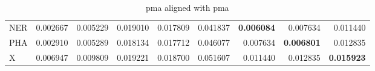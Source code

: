 \begin{table}[H]
\begin{center}
{\begin{tabular}{lrrrrrrrr}
NER & {\cellcolor[HTML]{FCFED3}} \color[HTML]{000000} 0.002667 & {\cellcolor[HTML]{F9FDC2}} \color[HTML]{000000} 0.005229 & {\cellcolor[HTML]{AFDE8F}} \color[HTML]{000000} 0.019010 & {\cellcolor[HTML]{B8E293}} \color[HTML]{000000} 0.017809 & {\cellcolor[HTML]{12763D}} \color[HTML]{F1F1F1} 0.041837 & {\cellcolor[HTML]{F7FCBC}} \color[HTML]{000000} \bfseries 0.006084 & {\cellcolor[HTML]{F2FAB5}} \color[HTML]{000000} 0.007634 & {\cellcolor[HTML]{E0F3A8}} \color[HTML]{000000} 0.011440 \\
PHA & {\cellcolor[HTML]{FBFED2}} \color[HTML]{000000} 0.002910 & {\cellcolor[HTML]{F8FDC1}} \color[HTML]{000000} 0.005289 & {\cellcolor[HTML]{B6E192}} \color[HTML]{000000} 0.018134 & {\cellcolor[HTML]{B9E294}} \color[HTML]{000000} 0.017712 & {\cellcolor[HTML]{006335}} \color[HTML]{F1F1F1} 0.046077 & {\cellcolor[HTML]{F2FAB5}} \color[HTML]{000000} 0.007634 & {\cellcolor[HTML]{F6FCB8}} \color[HTML]{000000} \bfseries 0.006801 & {\cellcolor[HTML]{DAF0A4}} \color[HTML]{000000} 0.012835 \\
X & {\cellcolor[HTML]{F5FBB8}} \color[HTML]{000000} 0.006947 & {\cellcolor[HTML]{E8F6AE}} \color[HTML]{000000} 0.009809 & {\cellcolor[HTML]{AEDD8E}} \color[HTML]{000000} 0.019221 & {\cellcolor[HTML]{B2DF90}} \color[HTML]{000000} 0.018700 & {\cellcolor[HTML]{004529}} \color[HTML]{F1F1F1} 0.051607 & {\cellcolor[HTML]{E0F3A8}} \color[HTML]{000000} 0.011440 & {\cellcolor[HTML]{DAF0A4}} \color[HTML]{000000} 0.012835 & {\cellcolor[HTML]{C5E89A}} \color[HTML]{000000} \bfseries 0.015923 \\
\bottomrule
\end{tabular}
}\end{center}
\caption{pma aligned with pma}\end{table}